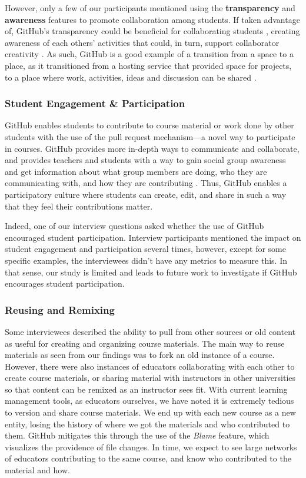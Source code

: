 However, only a few of our participants mentioned using the \textbf{transparency} and \textbf{awareness} features to promote collaboration among students. If taken advantage of, GitHub's transparency could be beneficial for collaborating students \cite{dalsgaard2009transparency}, creating awareness of each others' activities that could, in turn, support collaborator creativity \cite{farooq2007supporting}. As such, GitHub is a good example of a transition from a space to a place, as it transitioned from a hosting service that provided space for projects, to a place where work, activities, ideas and discussion can be shared \cite{dourish1992awareness}.
\\ %
\subsubsection{Student Engagement \& Participation}
GitHub enables students to contribute to course material or work done by other students with the use of the pull request mechanism---a novel way to participate in courses. GitHub provides more in-depth ways to communicate and collaborate, and provides teachers and students with a way to gain social group awareness and get information about what group members are doing, who they are communicating with, and how they are contributing \cite{janssen2013coordinated}. Thus, GitHub enables a participatory culture \cite{jenkins2009confronting} where students can create, edit, and share in such a way that they feel their contributions matter.

Indeed, one of our interview questions asked whether the use of GitHub encouraged student participation. Interview participants mentioned the impact on student engagement and participation several times, however, except for some specific examples, the interviewees didn't have any metrics to measure this. In that sense, our study is limited and leads to future work to investigate if GitHub encourages student participation.

\subsubsection{Reusing and Remixing}
Some interviewees described the ability to pull from other sources or old content as useful for creating and organizing course materials. The main way to reuse materials as seen from our findings was to fork an old instance of a course. However, there were also instances of educators collaborating with each other to create course materials, or sharing material with instructors in other universities so that content can be remixed as an instructor sees fit. With current learning management tools, as educators ourselves, we have noted it is extremely tedious to version and share course materials. We end up with each new course as a new entity, losing the history of where we got the materials and who contributed to them. GitHub mitigates this through the use of the \textit{Blame} feature, which visualizes the providence of file changes. In time, we expect to see large networks of educators contributing to the same course, and know who contributed to the material and how.

